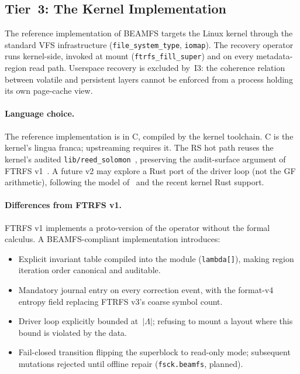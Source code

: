 \subsection{Tier~3: The Kernel Implementation}\label{sec:m2c-tier3}

The reference implementation of BEAMFS targets the Linux kernel
through the standard VFS infrastructure
(\texttt{file\_system\_type}, \texttt{iomap}). The recovery
operator runs kernel-side, invoked at mount
(\texttt{ftrfs\_fill\_super}) and on every metadata-region read
path. Userspace recovery is excluded by~I3: the coherence relation
between volatile and persistent layers cannot be enforced from a
process holding its own page-cache view.

\paragraph{Language choice.}
The reference implementation is in C, compiled by the kernel
toolchain. C is the kernel's lingua franca; upstreaming requires
it. The RS hot path reuses the kernel's audited
\texttt{lib/reed\_solomon}~\cite{kernelrslib}, preserving the
audit-surface argument of FTRFS v1~\cite{desbrieres2026ftrfs}.
A future v2 may explore a Rust port of the driver loop (not the
GF arithmetic), following the model
of~\cite{sigurbjarnarson2016yggdrasil} and the recent
kernel Rust support.

\paragraph{Differences from FTRFS v1.}
FTRFS v1 implements a proto-version of the operator without the
formal calculus. A BEAMFS-compliant implementation introduces:
\begin{itemize}
\item Explicit invariant table compiled into the module
  (\texttt{lambda[]}), making region iteration order canonical and
  auditable.
\item Mandatory journal entry on every correction event, with the
  format-v4 entropy field replacing FTRFS v3's coarse symbol count.
\item Driver loop explicitly bounded at~\(|\Lambda|\); refusing to
  mount a layout where this bound is violated by the data.
\item Fail-closed transition flipping the superblock to read-only
  mode; subsequent mutations rejected until offline repair
  (\texttt{fsck.beamfs}, planned).
\end{itemize}

